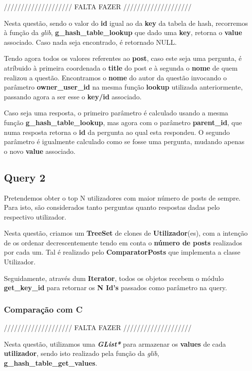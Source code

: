 \documentclass[a4paper]{article}
\begin{document}
//////////////////// FALTA FAZER ////////////////////

Nesta questão, sendo o valor do \textbf{id} igual ao da \textbf{key} 
da tabela de hash, recorremos à função da \textit{glib},
\textbf{g\_hash\_table\_lookup} que dado uma \textbf{key},
retorna o \textbf{value} associado. Caso nada seja encontrado,
é retornado NULL.

Tendo agora todos os valores referentes ao \textbf{post}, caso este
seja uma pergunta, é atríbuido à primeira coordenada o \textbf{title}
do post e à segunda o \textbf{nome} de quem realizou a questão.
Encontramos o \textbf{nome} do autor da questão invocando o parâmetro
\textbf{owner\_user\_id} na mesma função \textbf{lookup} utilizada 
anteriormente, passando agora a ser esse o \textbf{key/id} associado.

Caso seja uma resposta, o primeiro parâmetro é calculado usando a mesma 
função \textbf{g\_hash\_table\_lookup}, mas agora com o 
parâmetro \textbf{parent\_id}, que numa resposta retorna o \textbf{id} 
da pergunta ao qual esta respondeu. O segundo parâmetro é igualmente
calculado como se fosse uma pergunta, mudando apenas o novo 
\textbf{value} associado.

\subsection{Query 2}

Pretendemos obter o top N utilizadores com maior número de posts de 
sempre. Para isto, são considerados tanto perguntas quanto respostas 
dadas pelo respectivo utilizador.

Nesta questão, criamos um \textbf{TreeSet} de clones de 
\textbf{Utilizador}(es), com a intenção de os ordenar decrescentemente 
tendo em conta o \textbf{número de posts} realizados por cada um. 
Tal é realizado pelo \textbf{ComparatorPosts} que implementa a classe
Utilizador.

Seguidamente, através dum \textbf{Iterator}, todos os objetos recebem
o módulo \textbf{get\_key\_id} para retornar os \textbf{N Id's} passados
como parâmetro na query.

\subsubsection{Comparação com C}

//////////////////// FALTA FAZER ////////////////////

Nesta questão, utilizamos uma \textit{\textbf{GList*}} para armazenar 
os \textbf{values} de cada \textbf{utilizador}, sendo isto realizado
pela função da \textit{glib}, \textbf{g\_hash\_table\_get\_values}.
\end{document}
